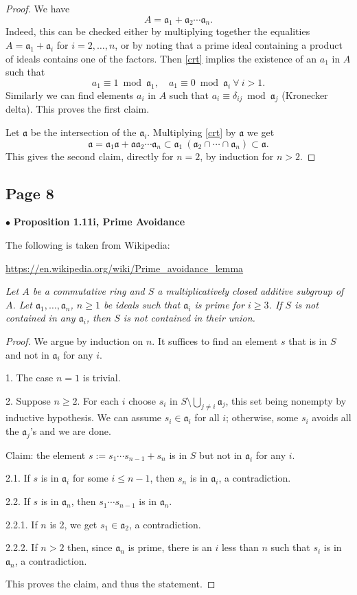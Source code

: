 \documentclass[parskip=half,fontsize=12pt]{scrartcl}%
\newcommand{\mf}{\mathfrak}
\newcommand{\aaa}{\mf a}
\newcommand{\bu}{\bullet}
\begin{document}
\begin{proof} 
We have
\begin{equation}\label{crt}
A=\aaa_1+\aaa_2\cdots\aaa_n.
\end{equation}
Indeed, this can be checked either by multiplying together the equalities $A=\aaa_1+\aaa_i$ for $i=2,\dots,n$, or by noting that a prime ideal containing a product of ideals contains one of the factors. Then \eqref{crt} implies the existence of an $a_1$ in $A$ such that
$$
a_1\equiv1\bmod\aaa_1,\quad a_1\equiv0\bmod \aaa_i\ \forall\ i > 1.
$$
Similarly we can find elements $a_i$ in $A$ such that $a_i\equiv\delta_{ij}\bmod \aaa_j$ (Kronecker delta). This proves the first claim.

Let $\aaa$ be the intersection of the $\aaa_i$. Multiplying \eqref{crt} by $\aaa$ we get
$$
\aaa=
\aaa_1\aaa+
\aaa\aaa_2\cdots\aaa_n\subset
\aaa_1\ (\aaa_2\cap\cdots \cap \aaa_n)\subset \aaa.
$$
This gives the second claim, directly for $n=2$, by induction for $n>2$. 
\end{proof}

\subsection{Page 8}%

$\bu$ \textbf{Proposition 1.11i, Prime Avoidance}%

The following is taken from Wikipedia:

\href{https://en.wikipedia.org/wiki/Prime_avoidance_lemma}{https://en.wikipedia.org/wiki/Prime\_avoidance\_lemma}

\emph{Let $A$ be a commutative ring and $S$ a multiplicatively closed additive subgroup of $A$. Let $\mf a_1,\dots,\mf a_n$, $n\ge1$ be ideals such that $\mf a_i$ is prime for $i\ge3$. If $S$ is not contained in any $\mf a_i$, then $S$ is not contained in their union.}

\begin{proof} 
We argue by induction on $n$. It suffices to find an element $s$ that is in $S$ and not in $\mf a_i$ for any $i$. 

1. The case $n=1$ is trivial. 

2. Suppose $n\ge2$. For each $i$ choose $s_i$ in $S\setminus\bigcup_{j \ne i}\mf a_j$, this set being nonempty by inductive hypothesis. We can assume $s_i \in \mf a_i$ for all $i$; otherwise, some $s_i$ avoids all the $\mf a_j$'s and we are done. 

Claim: the element $s:=s_1\cdots s_{n-1}+s_n$ is in $S$ but not in $\mf a_i$ for any $i$. 

2.1. If $s$ is in $\mf a_i$ for some $i\le n-1$, then $s_n$ is in $\mf a_i$, a contradiction. 

2.2. If $s$ is in $\mf a_n$, then $s_1\cdots s_{n-1}$ is in $\mf a_n$. 

2.2.1. If $n$ is 2, we get $s_1\in \mf a_2$, a contradiction.

2.2.2. If $n>2$ then, since $\mf a_n$ is prime, there is an $i$ less than $n$ such that $s_i$ is in $\mf a_n$, a contradiction.

This proves the claim, and thus the statement. 
\end{proof}
\end{document}
